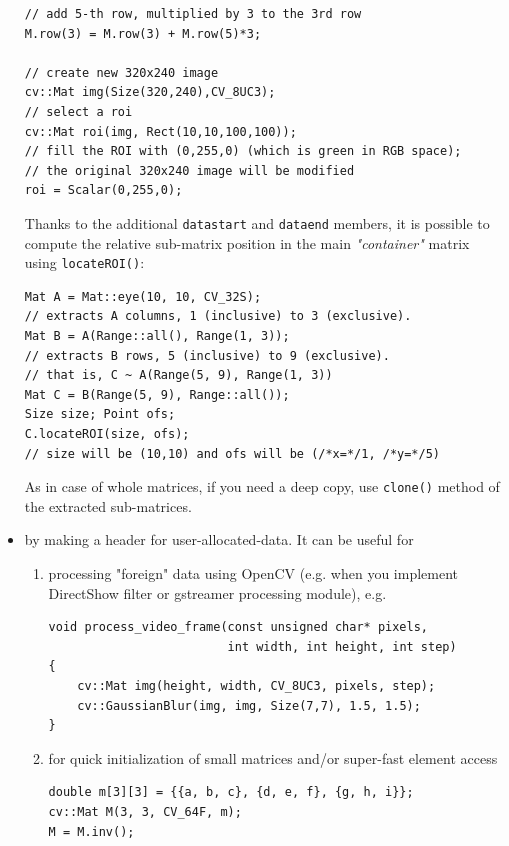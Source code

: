\begin{itemize}
\begin{lstlisting}
// add 5-th row, multiplied by 3 to the 3rd row
M.row(3) = M.row(3) + M.row(5)*3;

// create new 320x240 image
cv::Mat img(Size(320,240),CV_8UC3);
// select a roi
cv::Mat roi(img, Rect(10,10,100,100));
// fill the ROI with (0,255,0) (which is green in RGB space);
// the original 320x240 image will be modified
roi = Scalar(0,255,0);
\end{lstlisting}

      Thanks to the additional \texttt{datastart} and \texttt{dataend} members, it is possible to
      compute the relative sub-matrix position in the main \emph{"container"} matrix using \texttt{locateROI()}:
      
\begin{lstlisting}
Mat A = Mat::eye(10, 10, CV_32S);
// extracts A columns, 1 (inclusive) to 3 (exclusive).
Mat B = A(Range::all(), Range(1, 3));
// extracts B rows, 5 (inclusive) to 9 (exclusive).
// that is, C ~ A(Range(5, 9), Range(1, 3))
Mat C = B(Range(5, 9), Range::all());
Size size; Point ofs;
C.locateROI(size, ofs);
// size will be (10,10) and ofs will be (/*x=*/1, /*y=*/5)
\end{lstlisting}
          
      As in case of whole matrices, if you need a deep copy, use \texttt{clone()} method
      of the extracted sub-matrices.
          
\item by making a header for user-allocated-data. It can be useful for
    \begin{enumerate}
        \item processing "foreign" data using OpenCV (e.g. when you implement
        DirectShow filter or gstreamer processing module), e.g.
            
\begin{lstlisting}
void process_video_frame(const unsigned char* pixels,
                         int width, int height, int step)
{
    cv::Mat img(height, width, CV_8UC3, pixels, step);
    cv::GaussianBlur(img, img, Size(7,7), 1.5, 1.5);
}
\end{lstlisting}
            
        \item for quick initialization of small matrices and/or super-fast element access
\begin{lstlisting}
double m[3][3] = {{a, b, c}, {d, e, f}, {g, h, i}};
cv::Mat M(3, 3, CV_64F, m);
M = M.inv();
\end{lstlisting}
        \end{enumerate}
        

\end{itemize}
